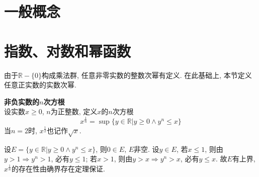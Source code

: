 

\section{一般概念}

\section{指数、对数和幂函数}

\par 由于$\mathbb{R}-\{0\}$构成乘法群, 任意非零实数的整数次幂有定义. 在此基础上, 本节定义任意正实数的实数次幂. 

\begin{dfn} \textbf{非负实数的$n$次方根}\\
设实数$x\ge 0$, $n$为正整数, 定义$x$的$n$次方根
\begin{equation}
    x^{\frac{1}{n}}=\sup \{y\in \mathbb{R}\vert y\ge 0 \land y^n \le x\}
\end{equation}
当$n=2$时, $x^{\frac{1}{2}}$也记作$\sqrt{x}$. 
\end{dfn}
\par 设$E=\{y\in \mathbb{R}\vert y\ge 0 \land y^n \le x\}$, 则$0\in E$, $E$非空. 设$y\in E$, 若$x\le 1$, 则由$y>1 \Rightarrow y^n>1$, 必有$y\le 1$; 若$x > 1$, 则由$y>x \Rightarrow y^n>x$, 必有$y\le x$. 故$E$有上界, $x^{\frac{1}{n}}$的存在性由确界存在定理保证.

